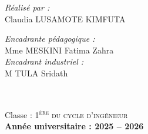 \documentclass[a4paper,12pt]{extarticle}
\begin{document}
\begin{titlepage}
    \begin{minipage}{0.45\textwidth}
        \begin{flushleft}\large
            \textcolor{hestimblue}{\emph{Réalisé par :}}\\[0.2cm]
            Claudia \textsc{LUSAMOTE KIMFUTA}\\
        \end{flushleft}
    \end{minipage}
    \hfill
    \begin{minipage}{0.45\textwidth}
        \begin{flushright}\large
            \textcolor{hestimblue}{\emph{Encadrante pédagogique :}}\\[0.2cm]
            Mme \textsc{MESKINI} Fatima Zahra\\[0.3cm]
            \textcolor{hestimblue}{\emph{Encadrant industriel :}}\\[0.2cm]
            M \textsc{TULA} Sridath
        \end{flushright}
    \end{minipage}\\[0.4cm]

\begin{tcolorbox}[enhanced, width=\linewidth, colback=hestimblue, colframe=hestimblue,
    boxrule=0pt, arc=0pt, left=6pt, right=6pt, top=6pt, bottom=6pt, halign=center]
    {\color{white}\normalsize Classe : \textsc{1\textsuperscript{ère} du cycle d'ingénieur}}\\[0.15cm]
    {\color{white}\textbf{Année universitaire : 2025 -- 2026}}
\end{tcolorbox}

\end{titlepage}



\newpage

\newpage


\newpage
\tableofcontents

\newpage
\listoffigures

\newpage
\listoftables

\newpage


\clearpage
{}
\end{document}
